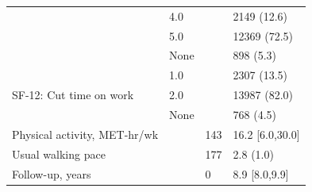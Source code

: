 \begin{tabular}{llll}
 & 4.0 &  & 2149 (12.6) \\
 & 5.0 &  & 12369 (72.5) \\
 & None &  & 898 (5.3) \\
\cline{1-4}
\multirow[t]{3}{*}{SF-12: Cut time on work} & 1.0 &  & 2307 (13.5) \\
 & 2.0 &  & 13987 (82.0) \\
 & None &  & 768 (4.5) \\
\cline{1-4}
Physical activity, MET-hr/wk &  & 143 & 16.2 [6.0,30.0] \\
\cline{1-4}
Usual walking pace &  & 177 & 2.8 (1.0) \\
\cline{1-4}
Follow-up, years &  & 0 & 8.9 [8.0,9.9] \\
\cline{1-4}
\bottomrule
\end{tabular}
